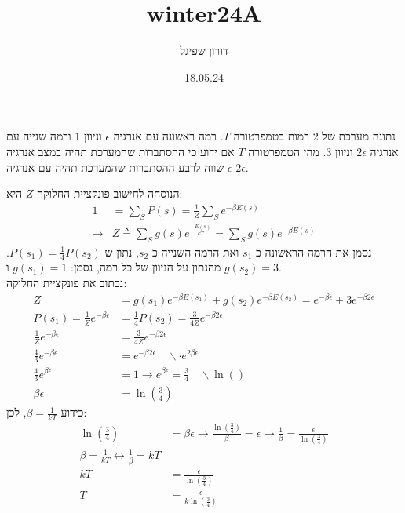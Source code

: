 \documentclass{article}
\title{winter24A}
\author{דורון שפיגל}
\date{18.05.24}
\begin{document}
\maketitle
\begin{Question}
נתונה מערכת של 2 רמות בטמפרטורה $T$. רמה ראשונה עם אנרגיה $\epsilon$ וניוון $1$ ורמה שנייה עם אנרגיה $2\epsilon$ וניוון $3$. מהי הטמפרטורה $T$  אם ידוע כי ההסתברות שהמערכת תהיה במצב אנרגיה $\epsilon$ שווה לרבע ההסתברות שהמערכת תהיה עם אנרגיה $2\epsilon$.
\end{Question}
\begin{Answer}
הנוסחה לחישוב פונקציית החלוקה $Z$ היא:
\begin{align}\label{פונקציית החלוקה}
    1&=\sum \limits^{}_{S}{P\left( s \right)}=\frac{1}{Z}\sum \limits^{}_{S}{e^{-\beta E\left( s \right)}}\\
    \rightarrow&Z\triangleq \sum \limits^{}_{S}{g(s)e^{\frac{-E\left( s \right)}{kT} }}=\sum \limits^{}_{S}{g(s)e^{-\beta E\left( s \right)}}
\end{align}
נסמן את הרמה הראשונה כ $s_{1}$ ואת הרמה השנייה כ $s_{2}$, נתון ש $P(s_{1})=\frac{1}{4}P(s_{2})$. מהנתון על הניוון של כל רמה, נסמן: $g(s_{1})=1$ ו $g(s_{2})=3$.\\
נכתוב את פונקציית החלוקה:
\begin{align*}
    Z&=g(s_{1})e^{-\beta E(s_{1})}+g(s_{2})e^{-\beta E(s_{2})}=e^{-\beta \epsilon}+3e^{-\beta 2\epsilon}\\
    P(s_{1})=\frac{1}{Z}e^{-\beta \epsilon}&=\frac{1}{4}P(s_{2})=\frac{3}{4Z}e^{-\beta 2\epsilon}\\
    \frac{1}{Z}e^{-\beta \epsilon}&=\frac{3}{4Z}e^{-\beta 2\epsilon}\\
    \frac{4}{3}e^{-\beta \epsilon}&=e^{-\beta 2\epsilon}\quad \backslash \cdot e^{2\beta \epsilon}\\
    \frac{4}{3}e^{\beta \epsilon}&=1\rightarrow e^{\beta \epsilon} = \frac{3}{4}\quad\backslash \ln\left(  \right)\\
    \beta \epsilon&=\ln\left( \frac{3}{4} \right)
\end{align*}
כידוע $\beta=\frac{1}{kT}$, לכן:
\begin{align*}
    \ln\left( \frac{3}{4} \right)&=\beta \epsilon\rightarrow \frac{\ln\left( \frac{3}{4} \right)}{\beta}=\epsilon\rightarrow \frac{1}{\beta}=\frac{\epsilon}{\ln\left( \frac{3}{4} \right)}\\
    \beta=\frac{1}{kT}\leftrightarrow \frac{1}{\beta}=kT\\
    kT&=\frac{\epsilon}{\ln\left( \frac{3}{4} \right)}\\
    T&=\frac{\epsilon}{k\ln\left( \frac{3}{4} \right)}
\end{align*}
\end{Answer}\newpage
\end{document}
